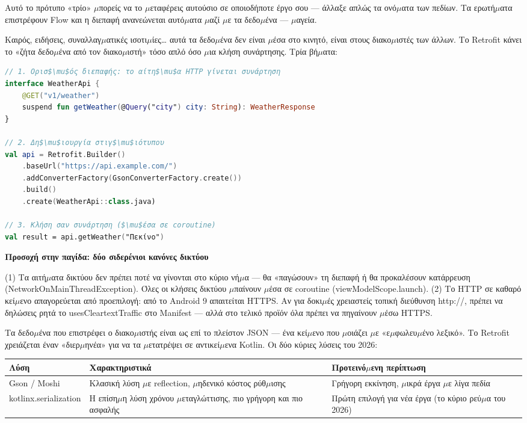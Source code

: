 Αυτό το πρότυπο «τρίο» $\mu$πορείς να το $\mu$εταφέρεις αυτούσιο σε οποιοδήποτε έργο σου — άλλαξε απλώς τα ονό$\mu$ατα των πεδίων. Τα ερωτή$\mu$ατα επιστρέφουν Flow και η διεπαφή ανανεώνεται αυτό$\mu$ατα $\mu$αζί $\mu$ε τα δεδο$\mu$ένα — $\mu$αγεία.


Καιρός, ειδήσεις, συναλλαγ$\mu$ατικές ισοτι$\mu$ίες… αυτά τα δεδο$\mu$ένα δεν είναι $\mu$έσα στο κινητό, είναι στους διακο$\mu$ιστές των άλλων. Το Retrofit κάνει το «ζήτα δεδο$\mu$ένα από τον διακο$\mu$ιστή» τόσο απλό όσο $\mu$ια κλήση συνάρτησης. Τρία βή$\mu$ατα:

\begin{lstlisting}[language=Kotlin]
// 1. Ορισ$\mu$ός διεπαφής: το αίτη$\mu$α HTTP γίνεται συνάρτηση
interface WeatherApi {
    @GET("v1/weather")
    suspend fun getWeather(@Query("city") city: String): WeatherResponse
}

// 2. Δη$\mu$ιουργία στιγ$\mu$ιότυπου
val api = Retrofit.Builder()
    .baseUrl("https://api.example.com/")
    .addConverterFactory(GsonConverterFactory.create())
    .build()
    .create(WeatherApi::class.java)

// 3. Κλήση σαν συνάρτηση ($\mu$έσα σε coroutine)
val result = api.getWeather("Πεκίνο")
\end{lstlisting}

\textbf{Προσοχή στην παγίδα: δύο σιδερένιοι κανόνες δικτύου}\par

(1) Τα αιτή$\mu$ατα δικτύου δεν πρέπει ποτέ να γίνονται στο κύριο νή$\mu$α — θα «παγώσουν» τη διεπαφή ή θα προκαλέσουν κατάρρευση (NetworkOnMainThreadException). Όλες οι κλήσεις δικτύου $\mu$παίνουν $\mu$έσα σε coroutine (viewModelScope.launch). (2) Το HTTP σε καθαρό κεί$\mu$ενο απαγορεύεται από προεπιλογή: από το Android 9 απαιτείται HTTPS. Αν για δοκι$\mu$ές χρειαστείς τοπική διεύθυνση http://, πρέπει να δηλώσεις ρητά το usesCleartextTraffic στο Manifest — αλλά στο τελικό προϊόν όλα πρέπει να πηγαίνουν $\mu$έσω HTTPS.


Τα δεδο$\mu$ένα που επιστρέφει ο διακο$\mu$ιστής είναι ως επί το πλείστον JSON — ένα κεί$\mu$ενο που $\mu$οιάζει $\mu$ε «ε$\mu$φωλευ$\mu$ένο λεξικό». Το Retrofit χρειάζεται έναν «διερ$\mu$ηνέα» για να τα $\mu$ετατρέψει σε αντικεί$\mu$ενα Kotlin. Οι δύο κύριες λύσεις του 2026:

\begin{center}
\begin{tabularx}{\linewidth}{|X|X|X|}
\hline
\textbf{Λύση} & \textbf{Χαρακτηριστικά} & \textbf{Προτεινό$\mu$ενη περίπτωση} \tabularnewline
\hline
Gson / Moshi & Κλασική λύση $\mu$ε reflection, $\mu$ηδενικό κόστος ρύθ$\mu$ισης & Γρήγορη εκκίνηση, $\mu$ικρά έργα $\mu$ε λίγα πεδία \tabularnewline
kotlinx.serialization & Η επίση$\mu$η λύση χρόνου $\mu$εταγλώττισης, πιο γρήγορη και πιο ασφαλής & Πρώτη επιλογή για νέα έργα (το κύριο ρεύ$\mu$α του 2026) \tabularnewline
\hline
\end{tabularx}
\end{center}

